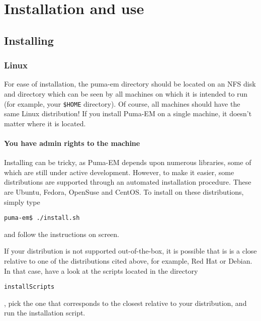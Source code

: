 \documentclass[a4paper,10pt]{book}
\begin{document}
\part{Installation and use}

\chapter{Installing}

\section{Linux}
%
\par
For ease of installation, the puma-em directory should be located on an NFS disk and directory which can be seen by all machines on which it is intended to run (for example, your \texttt{\$HOME} directory). Of course, all machines should have the same Linux distribution! If you install Puma-EM on a single machine, it doesn't matter where it is located.

\subsection{You have admin rights to the machine}
%
\par
Installing can be tricky, as Puma-EM depends upon numerous libraries, some of which are still under active development. However, to make it easier, some distributions are supported through an automated installation procedure. These are Ubuntu, Fedora, OpenSuse and CentOS. To install on these distributions, simply type 
\begin{verbatim}
puma-em$ ./install.sh
\end{verbatim}
and follow the instructions on screen.
%
\par
If your distribution is not supported out-of-the-box, it is possible that is is a close relative to one of the distributions cited above, for example, Red Hat or Debian. In that case, have a look at the scripts located in the directory \begin{verbatim}installScripts\end{verbatim}, pick the one that corresponds to the closest relative to your distribution, and run the installation script.
\end{document}
